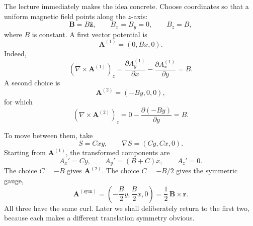 The lecture immediately makes the idea concrete. Choose coordinates so that a uniform magnetic field points along the \(z\)-axis:
\begin{equation}
  \mathbf B=B\hat{\mathbf z},
  \qquad
  B_x=B_y=0,
  \qquad
  B_z=B,
\end{equation}
where \(B\) is constant. A first vector potential is
\begin{equation}
  \mathbf A^{(1)}=(0,Bx,0).
\end{equation}
Indeed,
\begin{equation}
  (\nabla\times\mathbf A^{(1)})_z
  =
  \frac{\partial A_y^{(1)}}{\partial x}
  -
  \frac{\partial A_x^{(1)}}{\partial y}
  =B.
\end{equation}
A second choice is
\begin{equation}
  \mathbf A^{(2)}=(-By,0,0),
\end{equation}
for which
\begin{equation}
  (\nabla\times\mathbf A^{(2)})_z
  =
  0-\frac{\partial(-By)}{\partial y}
  =B.
\end{equation}

To move between them, take
\begin{equation}
  S=Cxy,
  \qquad
  \nabla S=(Cy,Cx,0).
\end{equation}
Starting from \(\mathbf A^{(1)}\), the transformed components are
\begin{equation}
  A_x'=Cy,
  \qquad
  A_y'=(B+C)x,
  \qquad
  A_z'=0.
\end{equation}
The choice \(C=-B\) gives \(\mathbf A^{(2)}\). The choice \(C=-B/2\) gives the symmetric gauge,
\begin{equation}
  \mathbf A^{(\mathrm{sym})}
  =
  \left(-\frac{B}{2}y,\frac{B}{2}x,0\right)
  =
  \frac12\,\mathbf B\times\mathbf r.
\end{equation}
All three have the same curl. Later we shall deliberately return to the first two, because each makes a different translation symmetry obvious.

\begin{classroomqa}
\end{classroomqa}


